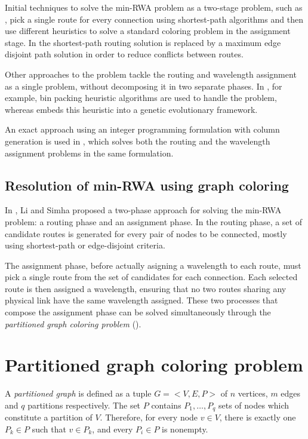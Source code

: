 Initial techniques to solve the min-RWA problem as a two-stage problem, such as \cite{hyytia14wavelength}, pick a single route for every connection using shortest-path algorithms and then use different heuristics to solve a standard coloring problem in the assignment stage. In \cite{manohar2002routing} the shortest-path routing solution is replaced by a maximum edge disjoint path solution in order to reduce conflicts between routes.

Other approaches to the problem tackle the routing and wavelength assignment as a single problem, without decomposing it in two separate phases. In \cite{skorin2007routing}, for example, bin packing heuristic algorithms are used to handle the problem, whereas \cite{noronha2007random} embeds this heuristic into a genetic evolutionary framework.

An exact approach using an integer programming formulation with column generation is used in \cite{lee2002optimization}, which solves both the routing and the wavelength assignment problems in the same formulation.

\subsection*{Resolution of min-RWA using graph coloring}

In \cite{Li00thepartition}, Li and Simha proposed a two-phase approach for solving the min-RWA problem: a routing phase and an assignment phase. In the routing phase, a set of candidate routes is generated for every pair of nodes to be connected, mostly using shortest-path or edge-disjoint criteria.

The assignment phase, before actually asigning a wavelength to each route, must pick a single route from the set of candidates for each connection. Each selected route is then assigned a wavelength, ensuring that no two routes sharing any physical link have the same wavelength assigned. These two processes that compose the assignment phase can be solved simultaneously through the \textit{partitioned graph coloring problem} (\PCP{}).

\section{Partitioned graph coloring problem}

A \textit{partitioned graph} is defined as a tuple $G = <V,E,P>$ of $n$ vertices, $m$ edges and $q$ partitions respectively. The set $P$ contains $P_1, \ldots ,P_q$ sets of nodes which constitute a partition of $V$. Therefore, for every node $v \in V$, there is exactly one $P_k \in P$ such that $v \in P_k$, and every $P_i \in P$ is nonempty.

